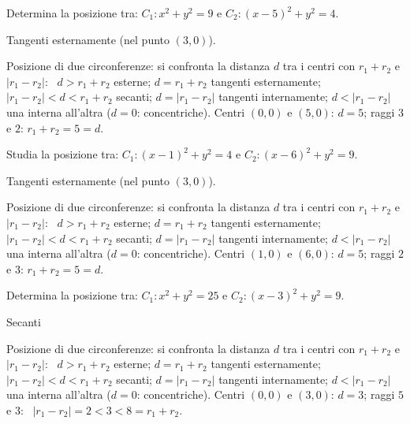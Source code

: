 
\begin{question}[ID=5.2, subtitle={Posizione di $C_1: x^2+y^2=9$ e $C_2: (x-5)^2+y^2=4$}, difficulty=facile, tags={circonferenze, posizione reciproca}]
Determina la posizione tra:
$C_1: x^2+y^2=9$ e $C_2: (x-5)^2+y^2=4$.
\begin{solution}
Tangenti esternamente (nel punto $(3,0)$).
\end{solution}
\begin{explanation}
Posizione di due circonferenze: si confronta la distanza $d$ tra i centri con $r_1+r_2$ e $|r_1-r_2|$: \ $d>r_1+r_2$ esterne; $d=r_1+r_2$ tangenti esternamente; $|r_1-r_2|<d<r_1+r_2$ secanti; $d=|r_1-r_2|$ tangenti internamente; $d<|r_1-r_2|$ una interna all'altra ($d=0$: concentriche).
Centri $(0,0)$ e $(5,0)$: $d=5$; raggi $3$ e $2$: $r_1+r_2=5=d$.
\end{explanation}
\end{question}


\begin{question}[ID=5.3, subtitle={Posizione di $C_1: (x-1)^2+y^2=4$ e $C_2: (x-6)^2+y^2=9$}, difficulty=media, tags={circonferenze, posizione reciproca}]
Studia la posizione tra:
$C_1: (x-1)^2+y^2=4$ e $C_2: (x-6)^2+y^2=9$.
\begin{solution}
Tangenti esternamente (nel punto $(3,0)$).
\end{solution}
\begin{explanation}
Posizione di due circonferenze: si confronta la distanza $d$ tra i centri con $r_1+r_2$ e $|r_1-r_2|$: \ $d>r_1+r_2$ esterne; $d=r_1+r_2$ tangenti esternamente; $|r_1-r_2|<d<r_1+r_2$ secanti; $d=|r_1-r_2|$ tangenti internamente; $d<|r_1-r_2|$ una interna all'altra ($d=0$: concentriche).
Centri $(1,0)$ e $(6,0)$: $d=5$; raggi $2$ e $3$: $r_1+r_2=5=d$.
\end{explanation}
\end{question}


\begin{question}[ID=5.4, subtitle={Posizione di $C_1: x^2+y^2=25$ e $C_2: (x-3)^2+y^2=9$}, difficulty=media, tags={circonferenze, posizione reciproca}]
Determina la posizione tra:
$C_1: x^2+y^2=25$ e $C_2: (x-3)^2+y^2=9$.
\begin{solution}
Secanti
\end{solution}
\begin{explanation}
Posizione di due circonferenze: si confronta la distanza $d$ tra i centri con $r_1+r_2$ e $|r_1-r_2|$: \ $d>r_1+r_2$ esterne; $d=r_1+r_2$ tangenti esternamente; $|r_1-r_2|<d<r_1+r_2$ secanti; $d=|r_1-r_2|$ tangenti internamente; $d<|r_1-r_2|$ una interna all'altra ($d=0$: concentriche).
Centri $(0,0)$ e $(3,0)$: $d=3$; raggi $5$ e $3$: \ $|r_1-r_2|=2<3<8=r_1+r_2$.
\end{explanation}
\end{question}

